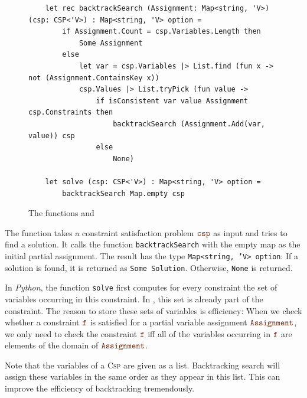 \begin{figure}[!ht]
\centering
\begin{verbatim}
    let rec backtrackSearch (Assignment: Map<string, 'V>) (csp: CSP<'V>) : Map<string, 'V> option =
        if Assignment.Count = csp.Variables.Length then
            Some Assignment
        else
            let var = csp.Variables |> List.find (fun x -> not (Assignment.ContainsKey x))
            csp.Values |> List.tryPick (fun value ->
                if isConsistent var value Assignment csp.Constraints then
                    backtrackSearch (Assignment.Add(var, value)) csp
                else
                    None)

    let solve (csp: CSP<'V>) : Map<string, 'V> option =
        backtrackSearch Map.empty csp
\end{verbatim}
\vspace*{-0.3cm}
\caption{The functions  and }
\label{fig:CSP-Solver.ipynb-backtrack_search}
\end{figure}

\noindent
The function  takes a constraint satisfaction problem $\mytt{csp}$ as input and tries to find a
solution.  It calls the function \texttt{backtrackSearch} with the empty map as the initial partial assignment.
The result has the type \texttt{Map<string, 'V> option}:  If a solution is found, it is returned as
\texttt{Some Solution}.  Otherwise, \texttt{None} is returned.

In \textsl{Python}, the function \texttt{solve} first computes for every constraint the set of variables
occurring in this constraint.  In \Fsharp, this set is already part of the constraint.  The reason to
store these sets of variables is efficiency: When we check whether a constraint $\mytt{f}$ is satisfied for a
partial variable assignment $\mytt{Assignment}$, we only need to check the constraint $\mytt{f}$ iff all of the
variables occurring in $\mytt{f}$ are elements of the domain of $\mytt{Assignment}$.

Note that the variables of a \textsc{Csp} are given as a list.  Backtracking search will assign these variables 
in the same order as they appear in this list.  This can improve the efficiency of backtracking tremendously. 

